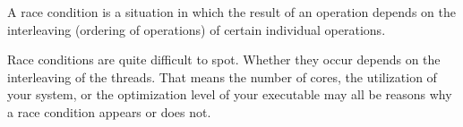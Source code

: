 A race condition is a situation in which the result of an operation depends on the interleaving (ordering of operations) of certain individual operations.

Race conditions are quite difficult to spot. Whether they occur depends on the interleaving of the threads. That means the number of cores, the utilization of your system, or the optimization level of your executable may all be reasons why a race condition appears or does not.